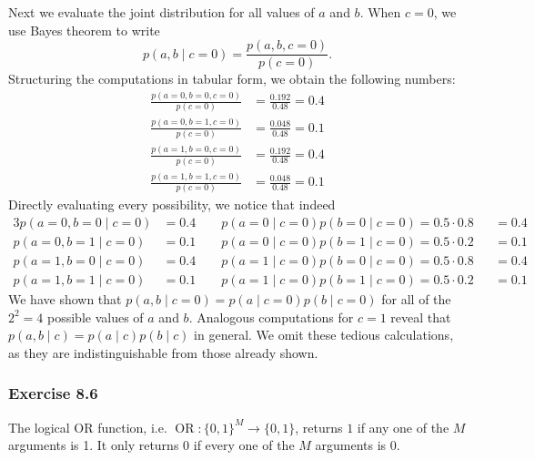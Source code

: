 \documentclass[12pt, a4paper]{article}
\begin{document}
Next we evaluate the joint  distribution for all values of $a$ and $b$. 
When $c=0$, we use Bayes theorem to write
\begin{equation*}
	p(a, b \mid c=0) = \frac{p(a, b, c=0)}{p(c=0)}.
\end{equation*}
Structuring the computations in tabular form, we obtain the following numbers:
\begin{align*}
	\frac{p(a=0, b=0, c=0)}{p(c=0)} &= \frac{0.192}{0.48} = 0.4 \\
	\frac{p(a=0, b=1, c=0)}{p(c=0)} &= \frac{0.048}{0.48} = 0.1 \\
	\frac{p(a=1, b=0, c=0)}{p(c=0)} &= \frac{0.192}{0.48} = 0.4 \\
	\frac{p(a=1, b=1, c=0)}{p(c=0)} &= \frac{0.048}{0.48} = 0.1 
\end{align*}
Directly evaluating every possibility, we notice that indeed
\begin{alignat*}{3}
	p(a=0, b=0 \mid c= 0) &= 0.4 \qquad 
	p(a=0 \mid c= 0) p( b=0 \mid c= 0)  = 0.5 \cdot 0.8 &&= 0.4 \\
	p(a=0, b=1 \mid c= 0) &= 0.1 \qquad 
	p(a=0 \mid c= 0) p( b=1 \mid c= 0)  = 0.5 \cdot 0.2 &&= 0.1 \\
	p(a=1, b=0 \mid c= 0) &= 0.4 \qquad 
	p(a=1 \mid c= 0) p( b=0 \mid c= 0)  = 0.5 \cdot 0.8 &&= 0.4 \\
	p(a=1, b=1 \mid c= 0) &= 0.1 \qquad 
	p(a=1 \mid c= 0) p( b=1 \mid c= 0)  = 0.5 \cdot 0.2 &&= 0.1
\end{alignat*}
We have shown that $p(a, b \mid c=0) = p(a\mid c=0) p(b\mid c=0)$ for all of the $2^2=4$ possible values of $a$ and $b$.
Analogous computations for $c=1$ reveal that $p(a, b \mid c) = p(a\mid c) p(b\mid c)$ in general. 
We omit these tedious calculations, as they are indistinguishable from those already shown. 




\subsubsection*{Exercise 8.6}
The logical OR function, i.e. $\operatorname{OR}: \{0,1\}^M \to \{0,1\}$, returns $1$ if any one of the $M$ arguments is 1. 
It only returns $0$ if every one of the $M$ arguments is $0$.
\end{document}
